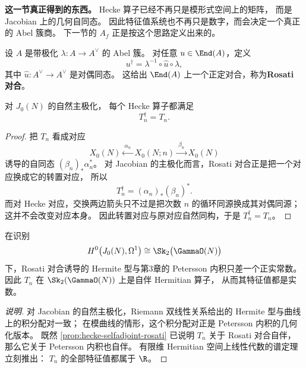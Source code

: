 \textbf{这一节真正得到的东西。}
Hecke 算子已经不再只是模形式空间上的矩阵，
而是 Jacobian 上的几何自同态。
因此特征值系统也不再只是数字，而会决定一个真正的 Abel 簇商。
下一节的 $A_f$ 正是按这个思路定义出来的。

\begin{definition}[Rosati 对合]
\label{def:rosati-involution}
设 $A$ 是带极化 $\lambda:A\to A^{\vee}$ 的 Abel 簇。
对任意 $u\in \End(A)$，定义
\[
  u^{\dagger}=\lambda^{-1}\circ \widehat{u}\circ \lambda,
\]
其中 $\widehat{u}:A^{\vee}\to A^{\vee}$ 是对偶同态。
这给出 $\End(A)$ 上一个正定对合，称为\textbf{Rosati 对合}。
\end{definition}

\begin{proposition}
\label{prop:hecke-selfadjoint-rosati}
对 $J_0(N)$ 的自然主极化，
每个 Hecke 算子都满足
\[
  T_n^{\dagger}=T_n.
\]
\end{proposition}

\begin{proof}
把 $T_n$ 看成对应
\[
  X_0(N) \xleftarrow{\ \alpha_n\ } X_0(N;n) \xrightarrow{\ \beta_n\ } X_0(N)
\]
诱导的自同态 $(\beta_n)_*\alpha_n^*$。
对 Jacobian 的主极化而言，Rosati 对合正是把一个对应换成它的转置对应，
所以
\[
  T_n^{\dagger}=(\alpha_n)_*(\beta_n)^*.
\]
而对 Hecke 对应，交换两边箭头只不过是把次数 $n$ 的循环同源换成其对偶同源；
这并不会改变对应本身。
因此转置对应与原对应自然同构，于是 $T_n^{\dagger}=T_n$。
\end{proof}

\begin{corollary}
\label{cor:hecke-real-eigenvalues}
在识别
\[
  H^0\bigl(J_0(N),\Omega^1\bigr)\cong \Sk_2\bigl(\GammaO(N)\bigr)
\]
下，Rosati 对合诱导的 Hermite 型与第3章的 Petersson 内积只差一个正实常数。
因此 $T_n$ 在 $\Sk_2(\GammaO(N))$ 上是自伴 Hermitian 算子，
从而其特征值都是实数。
\end{corollary}

\begin{proof}[说明]
对 Jacobian 的自然主极化，Riemann 双线性关系给出的 Hermite 型与曲线上的积分配对一致；
在模曲线的情形，这个积分配对正是 Petersson 内积的几何化版本。
既然 \cref{prop:hecke-selfadjoint-rosati} 已说明 $T_n$ 关于 Rosati 对合自伴，
那么它关于 Petersson 内积也自伴。
有限维 Hermitian 空间上线性代数的谱定理立刻推出：
$T_n$ 的全部特征值都属于 $\R$。
\end{proof}

